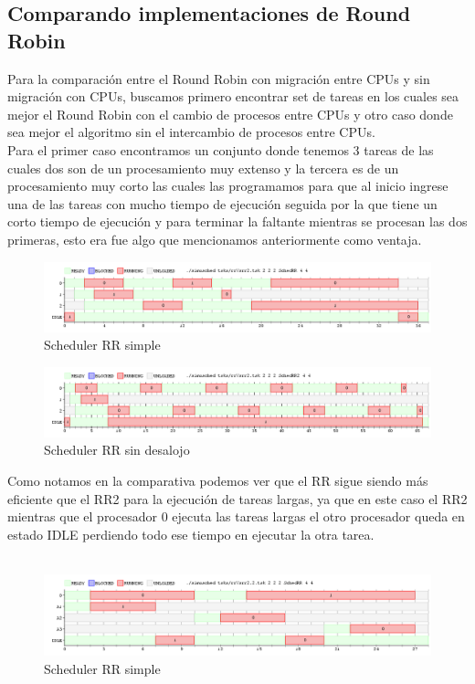 \subsection{Comparando implementaciones de Round Robin}
Para la comparación entre el Round Robin con migración entre CPUs y sin migración con CPUs, buscamos primero encontrar set de tareas en los cuales sea mejor el Round Robin con el cambio de procesos entre CPUs y otro caso donde sea mejor el algoritmo sin el intercambio de procesos entre CPUs.
\\
Para el primer caso encontramos un conjunto donde tenemos 3 tareas de las cuales dos son de un procesamiento muy extenso y la tercera es de un procesamiento muy corto las cuales las programamos para que al inicio ingrese una de las tareas con mucho tiempo de ejecución seguida por la que tiene un corto tiempo de ejecución y para terminar la faltante mientras se procesan las dos primeras, esto era fue algo que mencionamos anteriormente como ventaja.
\\
\begin{figure}[H]
  \centering
\includegraphics[scale=0.45]{graficos/rrVsrr2/1.png}
  \caption[Caption for LOF]{Scheduler RR simple}
\end{figure}
\begin{figure}[H]
  \centering
\includegraphics[scale=0.45]{graficos/rrVsrr2/2.png}
  \caption[Caption for LOF]{Scheduler RR sin desalojo}
\end{figure}
Como notamos en la comparativa podemos ver que el RR sigue siendo más eficiente que el RR2 para la ejecución de tareas largas, ya que en este caso el RR2 mientras que el procesador 0 ejecuta las tareas largas el otro procesador queda en estado IDLE perdiendo todo ese tiempo en ejecutar la otra tarea.
\\
\\
\begin{figure}[H]
  \centering
\includegraphics[scale=0.45]{graficos/rrVsrr2/3.png}
  \caption[Caption for LOF]{Scheduler RR simple}
\end{figure}
